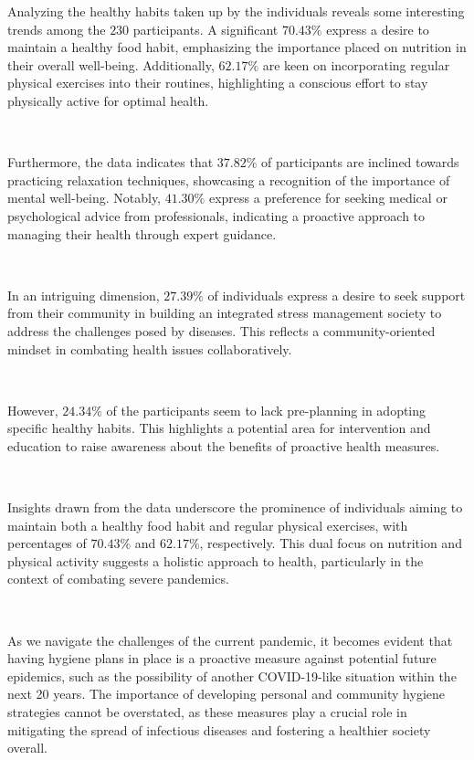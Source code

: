 Analyzing the healthy habits taken up by the individuals reveals some interesting trends among the $230$ participants. A significant $70.43\%$ express a desire to maintain a healthy food habit, emphasizing the importance placed on nutrition in their overall well-being. Additionally, $62.17\%$ are keen on incorporating regular physical exercises into their routines, highlighting a conscious effort to stay physically active for optimal health.

\

Furthermore, the data indicates that $37.82\%$ of participants are inclined towards practicing relaxation techniques, showcasing a recognition of the importance of mental well-being. Notably, $41.30\%$ express a preference for seeking medical or psychological advice from professionals, indicating a proactive approach to managing their health through expert guidance.

\

In an intriguing dimension, $27.39\%$ of individuals express a desire to seek support from their community in building an integrated stress management society to address the challenges posed by diseases. This reflects a community-oriented mindset in combating health issues collaboratively.

\

However, $24.34\%$ of the participants seem to lack pre-planning in adopting specific healthy habits. This highlights a potential area for intervention and education to raise awareness about the benefits of proactive health measures.

\

Insights drawn from the data underscore the prominence of individuals aiming to maintain both a healthy food habit and regular physical exercises, with percentages of $70.43\%$ and $62.17\%$, respectively. This dual focus on nutrition and physical activity suggests a holistic approach to health, particularly in the context of combating severe pandemics.

\

As we navigate the challenges of the current pandemic, it becomes evident that having hygiene plans in place is a proactive measure against potential future epidemics, such as the possibility of another COVID-19-like situation within the next 20 years. The importance of developing personal and community hygiene strategies cannot be overstated, as these measures play a crucial role in mitigating the spread of infectious diseases and fostering a healthier society overall.

